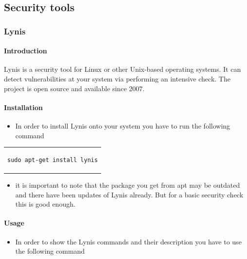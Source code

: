 \documentclass[a4paper,10pt]{article}
\begin{document}
\subsection{Security tools}

\subsubsection{Lynis}


\paragraph{Introduction}
Lynis is a security tool for Linux or other Unix-based operating systems. It can detect vulnerabilities at your system via performing an intensive check. The project is open source and available since 2007.

\paragraph{Installation}

\begin{itemize}[leftmargin=*]
\item In order to install Lynis onto your system you have to run the following command
\end{itemize}

\begin{center}
\begin{tabular}{c}
\begin{lstlisting}
sudo apt-get install lynis
\end{lstlisting}
\end{tabular}
\end{center}

\begin{itemize}[leftmargin=*]
\item it is important to note that the package you get from apt may be outdated and there have been updates of Lynis already. But for a basic security check this is good enough.
\end{itemize}

\paragraph{Usage}

\begin{itemize}[leftmargin=*]
\item In order to show the Lynis commands and their description you have to use the following command
\end{itemize}
\end{document}
